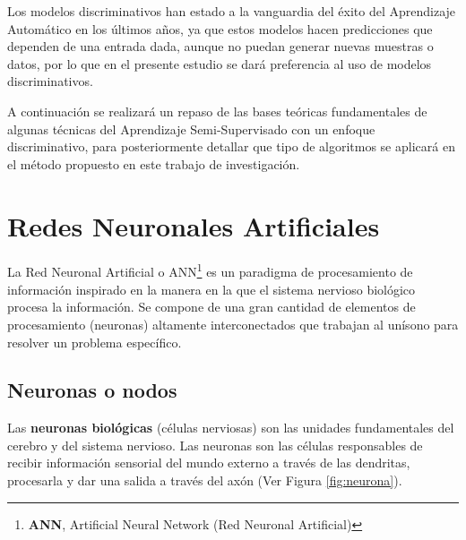 \vspace{5mm} %

Los modelos discriminativos han estado a la vanguardia del éxito del Aprendizaje Automático en los \'{u}ltimos a\~{n}os, ya que estos modelos hacen predicciones que dependen de una entrada dada, aunque no puedan generar nuevas muestras o datos, por lo que en el presente estudio se dar\'{a} preferencia al uso de modelos discriminativos.

\vspace{5mm} %

A continuaci\'{o}n se realizar\'{a} un repaso de las bases te\'{o}ricas fundamentales de algunas t\'{e}cnicas del Aprendizaje Semi-Supervisado con un enfoque discriminativo, para posteriormente detallar que tipo de algoritmos se aplicar\'{a} en el m\'{e}todo propuesto en este trabajo de investigaci\'{o}n.

\section{Redes Neuronales Artificiales}

La Red Neuronal Artificial o ANN\footnote{\textbf{ANN}, Artificial Neural Network (Red Neuronal Artificial)} es un paradigma de procesamiento de informaci\'{o}n inspirado en la manera en la que el sistema nervioso biol\'{o}gico procesa la informaci\'{o}n. Se compone de una gran cantidad de elementos de procesamiento (neuronas) altamente interconectados que trabajan al un\'{i}sono para resolver un problema espec\'{i}fico.

\subsection{Neuronas o nodos}

Las \textbf{neuronas biol\'{o}gicas} (c\'{e}lulas nerviosas) son las unidades fundamentales del cerebro y del sistema nervioso. Las neuronas son las c\'{e}lulas responsables de recibir informaci\'{o}n sensorial del mundo externo a trav\'{e}s de las dendritas, procesarla y dar una salida a trav\'{e}s del ax\'{o}n (Ver Figura \ref{fig:neurona}). 

